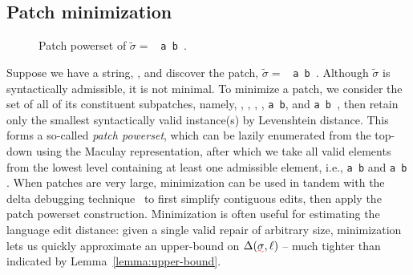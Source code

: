 \documentclass[sigplan,review,anonymous,acmsmall]{acmart}\settopmatter{printfolios=false,printccs=false,printacmref=false}
\begin{document}
\subsection{Patch minimization}

\begin{figure}
  \vspace{-14pt}
  \caption{Patch powerset of $\tilde{\sigma}=$ \texttt{\hlgreen{(} a \hlorange{+} b \hlgreen{)}}.}
\end{figure}

Suppose we have a string, \texttt{}, and discover the patch, $\tilde{\sigma}=$ \texttt{\hlgreen{(} a \hlorange{+} b \hlgreen{)}}. Although $\tilde{\sigma}$ is syntactically admissible, it is not minimal. To minimize a patch, we consider the set of all of its constituent subpatches, namely, \texttt{}, \texttt{}, \texttt{}, \texttt{}, \texttt{a \hlorange{+} b}, and \texttt{a \hlgreen{(} b \hlgreen{)}}, then retain only the smallest syntactically valid instance(s) by Levenshtein distance. This forms a so-called \textit{patch powerset}, which can be lazily enumerated from the top-down using the Maculay representation, after which we take all valid elements from the lowest level containing at least one admissible element, i.e., \texttt{a \hlorange{+} b} and \texttt{a \hlgreen{(} b \hlgreen{)}}. When patches are very large, minimization can be used in tandem with the delta debugging technique~\cite{zeller2002isolating} to first simplify contiguous edits, then apply the patch powerset construction. Minimization is often useful for estimating the language edit distance: given a single valid repair of arbitrary size, minimization lets us quickly approximate an upper-bound on $\Delta(\err{\sigma}, \ell)$ -- much tighter than indicated by Lemma~\ref{lemma:upper-bound}.
\end{document}
